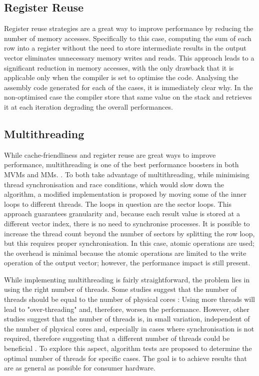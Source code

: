 \subsection{Register Reuse}\label{sec:reg_reuse}
Register reuse strategies are a great way to improve performance by reducing the number of memory accesses.
Specifically to this case, computing the sum of each row into a register without the need to store intermediate results in the output vector eliminates unnecessary memory writes and reads.
This approach leads to a significant reduction in memory accesses, with the only drawback that it is applicable only when the compiler is set to optimise the code.
Analysing the assembly code generated for each of the cases, it is immediately clear why.
In the non-optimised case the compiler store that same value on the stack and retrieves it at each iteration degrading the overall performances.\\

\subsection{Multithreading}\label{sec:multithread}
While cache-friendliness and register reuse are great ways to improve performance, multithreading is one of the best performance boosters in both MVMs and MMs.
\cite{yajnaseni_survey_2015,wyrzykowski_mathematical_2016,tang_multithreaded_2024,sulatycke_caching-efficient_1998}.
To both take advantage of multithreading, while minimising thread synchronisation and race conditions, which would slow down the algorithm, a modified implementation is proposed by moving some of the inner loops to different threads.
The loops in question are the sector loops.
This approach guarantees granularity and, because each result value is stored at a different vector index, there is no need to synchronise processes.
It is possible to increase the thread count beyond the number of sectors by splitting the row loop, but this requires proper synchronisation.
In this case, atomic operations are used; the overhead is minimal because the atomic operations are limited to the write operation of the output vector; however, the performance impact is still present.

While implementing multithreading is fairly straightforward, the problem lies in using the right number of threads.
Some studies suggest that the number of threads should be equal to the number of physical cores \cite{bhutani_exploring_2024}: Using more threads will lead to "over-threading" and, therefore, worsen the performance.
However, other studies suggest that the number of threads is, in small variation, independent of the number of physical cores and, especially in cases where synchronisation is not required, therefore suggesting that a different number of threads could be beneficial  \cite{cooper_how_2011}.
To explore this aspect, algorithm tests are proposed to determine the optimal number of threads for specific cases. The goal is to achieve results that are as general as possible for consumer hardware.

